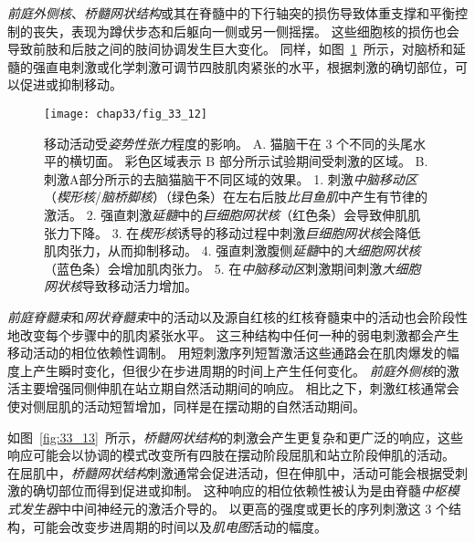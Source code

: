\textit{前庭外侧核}、\textit{桥髓网状结构}或其在脊髓中的下行轴突的损伤导致体重支撑和平衡控制的丧失，表现为蹲伏步态和后躯向一侧或另一侧摇摆。
这些细胞核的损伤也会导致前肢和后肢之间的肢间协调发生巨大变化。
同样，如图~\ref{fig:33_12}~所示，对脑桥和延髓的强直电刺激或化学刺激可调节四肢肌肉紧张的水平，根据刺激的确切部位，可以促进或抑制移动。


\begin{figure}[htbp]
	\centering
	\texttt{[image: chap33/fig\_33\_12]}
	\caption{移动活动受\textit{姿势性张力}程度的影响。
		A. 猫脑干在 3 个不同的头尾水平的横切面。
		彩色区域表示 B 部分所示试验期间受刺激的区域。
		B. 刺激A部分所示的去脑猫脑干不同区域的效果。
		1. 刺激\textit{中脑移动区}（\textit{楔形核}/\textit{脑桥脚核}）（绿色条）在左右后肢\textit{比目鱼肌}中产生有节律的激活。
		2. 强直刺激\textit{延髓}中的\textit{巨细胞网状核}（红色条）会导致伸肌肌张力下降。
		3. 在\textit{楔形核}诱导的移动过程中刺激\textit{巨细胞网状核}会降低肌肉张力，从而抑制移动。
		4. 强直刺激腹侧\textit{延髓}中的\textit{大细胞网状核}（蓝色条）会增加肌肉张力。
		5. 在\textit{中脑移动区}刺激期间刺激\textit{大细胞网状核}导致移动活力增加。}
	\label{fig:33_12}
\end{figure}


\textit{前庭脊髓束}和\textit{网状脊髓束}中的活动以及源自红核的红核脊髓束中的活动也会阶段性地改变每个步骤中的肌肉紧张水平。
这三种结构中任何一种的弱电刺激都会产生移动活动的相位依赖性调制。
用短刺激序列短暂激活这些通路会在肌肉爆发的幅度上产生瞬时变化，但很少在步进周期的时间上产生任何变化。
\textit{前庭外侧核}的激活主要增强同侧伸肌在站立期自然活动期间的响应。
相比之下，刺激红核通常会使对侧屈肌的活动短暂增加，同样是在摆动期的自然活动期间。


如图~\ref{fig:33_13}~所示，\textit{桥髓网状结构}的刺激会产生更复杂和更广泛的响应，这些响应可能会以协调的模式改变所有四肢在摆动阶段屈肌和站立阶段伸肌的活动。
在屈肌中，\textit{桥髓网状结构}刺激通常会促进活动，但在伸肌中，活动可能会根据受刺激的确切部位而得到促进或抑制。
这种响应的相位依赖性被认为是由脊髓\textit{中枢模式发生器}中中间神经元的激活介导的。
以更高的强度或更长的序列刺激这 3 个结构，可能会改变步进周期的时间以及\textit{肌电图}活动的幅度。


